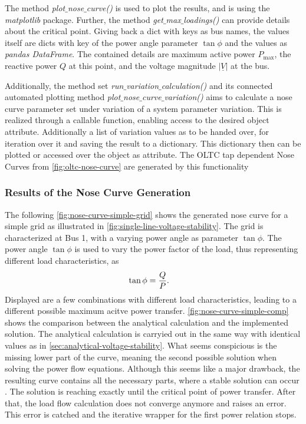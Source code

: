 The method {\itshape plot$\_$nose$\_$curve()} is used to plot the results, and is using the {\itshape matplotlib} package.
Further, the method {\itshape get$\_$max$\_$loadings()} can provide details about the critical point.
Giving back a dict with keys as bus names, the values itself are dicts with key of the power angle parameter $\tan \phi$ and the values as {\itshape pandas DataFrame}.
The contained details are maximum active power $P_\mathrm{max}$, the reactive power $Q$ at this point, and the voltage magnitude $\vert \underline{V} \vert$ at the bus.

Additionally, the method set \textit{run$\_$variation$\_$calculation()} and its connected automated plotting method \textit{plot$\_$nose$\_$curve$\_$variation()} aims to calculate a nose curve parameter set under variation of a system parameter variation.
This is realized through a callable function, enabling access to the desired object attribute.
Additionally a list of variation values as to be handed over, for iteration over it and saving the result to a dictionary.
This dictionary then can be plotted or accessed over the object as attribute.
The \acs{OLTC} tap dependent Nose Curves from \autoref{fig:oltc-nose-curve} are generated by this functionality

\subsubsection{Results of the Nose Curve Generation}

The following \autoref{fig:nose-curve-simple-grid} shows the generated nose curve for a simple grid as illustrated in \autoref{fig:single-line-voltage-stability}.
The grid is characterized at Bus 1, with a varying power angle as parameter $\tan \phi$.
The power angle $\tan \phi$ is used to vary the power factor of the load, thus representing different load characteristics, as
\begin{align}
        \tan \phi &= \frac{Q}{P}. \notag %
\end{align}
Displayed are a few combinations with different load characteristics, leading to a different possible maximum acitve power transfer.
\autoref{fig:nose-curve-simple-comp} shows the comparison between the analytical calculation and the implemented solution.
The analytical calculation is carryied out in the same way with identical values as in \autoref{sec:analytical-voltage-stability}.
What seems conspicious is the missing lower part of the curve, meaning the second possible solution when solving the power flow equations.
Although this seems like a major drawback, the resulting curve contains all the necessary parts, where a stable solution can occur \autocite{cutsem_1998}.
The solution is reaching exactly until the critical point of power transfer.
After that, the load flow calculation does not converge anymore and raises an error.
This error is catched and the iterative wrapper for the first power relation stops.


